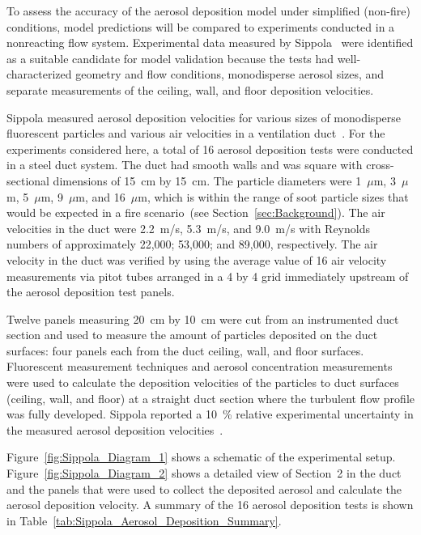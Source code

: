 To assess the accuracy of the aerosol deposition model under simplified (non-fire) conditions, model predictions will be compared to experiments conducted in a nonreacting flow system. Experimental data measured by Sippola~\cite{Sippola:2002,Sippola:2010} were identified as a suitable candidate for model validation because the tests had well-characterized geometry and flow conditions, monodisperse aerosol sizes, and separate measurements of the ceiling, wall, and floor deposition velocities.

Sippola measured aerosol deposition velocities for various sizes of monodisperse fluorescent particles and various air velocities in a ventilation duct~\cite{Sippola:2002,Sippola:2010}. For the experiments considered here, a total of 16 aerosol deposition tests were conducted in a steel duct system. The duct had smooth walls and was square with cross-sectional dimensions of 15~cm by 15~cm. The particle diameters were 1~$\mu$m, 3~$\mu$m, 5~$\mu$m, 9~$\mu$m, and 16~$\mu$m, which is within the range of soot particle sizes that would be expected in a fire scenario~(see Section~\ref{sec:Background}). The air velocities in the duct were 2.2~m/s, 5.3~m/s, and 9.0~m/s with Reynolds numbers of approximately 22,000; 53,000; and 89,000, respectively. The air velocity in the duct was verified by using the average value of 16 air velocity measurements via pitot tubes arranged in a 4 by 4 grid immediately upstream of the aerosol deposition test panels.

Twelve panels measuring 20~cm by 10~cm were cut from an instrumented duct section and used to measure the amount of particles deposited on the duct surfaces: four panels each from the duct ceiling, wall, and floor surfaces. Fluorescent measurement techniques and aerosol concentration measurements were used to calculate the deposition velocities of the particles to duct surfaces (ceiling, wall, and floor) at a straight duct section where the turbulent flow profile was fully developed. Sippola reported a 10~\% relative experimental uncertainty in the measured aerosol deposition velocities~\cite{Sippola:2002}. 

Figure~\ref{fig:Sippola_Diagram_1} shows a schematic of the experimental setup. Figure~\ref{fig:Sippola_Diagram_2} shows a detailed view of Section~2 in the duct and the panels that were used to collect the deposited aerosol and calculate the aerosol deposition velocity. A summary of the 16 aerosol deposition tests is shown in Table~\ref{tab:Sippola_Aerosol_Deposition_Summary}.

